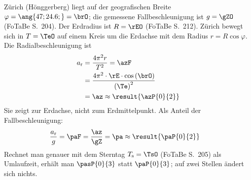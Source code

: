 \begin{center}
\end{center}

Zürich (Hönggerberg) liegt auf der geografischen Breite $\varphi = \ang{47;24.6;} = \brO$; die gemessene Fallbeschleunigung ist $g = \gZO$ (FoTaBe S.~204). Der Erdradius ist $R = \rEO$ (FoTaBe S.~212). Zürich bewegt sich in $T = \TeO$ auf einem Kreis um die Erdachse mit dem Radius $r = R\cos\varphi$. Die Radialbeschleunigung ist
\begin{align}
 a_\text{r} &= \frac{4\pi^2 r}{T^2} = \azF \\
   &= \frac{4\pi^2\cdot\rE\cdot\cos\left(\brO\right)}{\left(\Te\right)^2} \\
   &= \az \approx \result{\azP{0}{2}}
\end{align}
Sie zeigt zur Erdachse, nicht zum Erdmittelpunkt. Als Anteil der Fallbeschleunigung:
\begin{align}
 \frac{a_\text{r}}{g} &= \paF = \frac{\az}{\gZ} = \pa \approx \result{\paP{0}{2}}
\end{align}
Rechnet man genauer mit dem Sterntag $T_\text{s} = \TsO$ (FoTaBe S.~205) als Umlaufzeit, erhält man $\pasP{0}{3}$ statt $\paP{0}{3}$; auf zwei Stellen ändert sich nichts.
